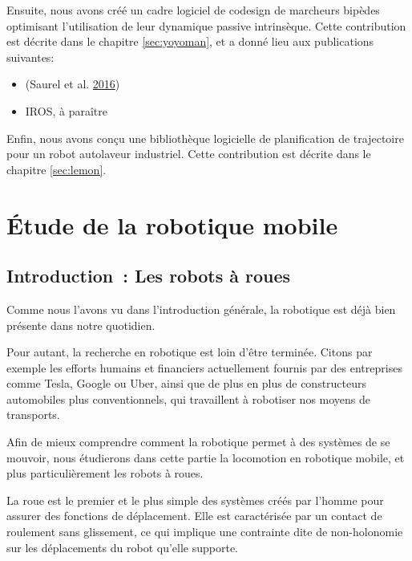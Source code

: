 \documentclass[french,A4paper,]{book}
\providecommand{\tightlist}{%
  \setlength{\itemsep}{0pt}\setlength{\parskip}{0pt}}
\begin{document}
Ensuite, nous avons créé un cadre logiciel de codesign de marcheurs
bipèdes optimisant l'utilisation de leur dynamique passive intrinsèque.
Cette contribution est décrite dans le chapitre \ref{sec:yoyoman}, et a
donné lieu aux publications suivantes:

\begin{itemize}
\tightlist
\item
  (Saurel et al. \protect\hyperlink{ref-saurel16}{2016})
\item
  IROS, à paraître
\end{itemize}

Enfin, nous avons conçu une bibliothèque logicielle de planification de
trajectoire pour un robot autolaveur industriel. Cette contribution est
décrite dans le chapitre \ref{sec:lemon}.

\part{Étude de la robotique mobile}\label{sec:mobile}

\setcounter{figure}{0} \setcounter{table}{0} \setcounter{algorithm}{0}
\renewcommand{\thefigure}{\Roman{part}-\arabic{figure}}
\renewcommand{\thetable}{\Roman{part}-\arabic{table}}
\renewcommand{\thealgorithm}{\Roman{part}-\arabic{algorithm}}

\chapter*{Introduction~: Les robots à
roues}\label{introduction-les-robots-uxe0-roues}

Comme nous l'avons vu dans l'introduction générale, la robotique est
déjà bien présente dans notre quotidien.

Pour autant, la recherche en robotique est loin d'être terminée. Citons
par exemple les efforts humains et financiers actuellement fournis par
des entreprises comme Tesla, Google ou Uber, ainsi que de plus en plus
de constructeurs automobiles plus conventionnels, qui travaillent à
robotiser nos moyens de transports.

Afin de mieux comprendre comment la robotique permet à des systèmes de
se mouvoir, nous étudierons dans cette partie la locomotion en robotique
mobile, et plus particulièrement les robots à roues.

La roue est le premier et le plus simple des systèmes créés par l'homme
pour assurer des fonctions de déplacement. Elle est caractérisée par un
contact de roulement sans glissement, ce qui implique une contrainte
dite de non-holonomie sur les déplacements du robot qu'elle supporte.
\end{document}
